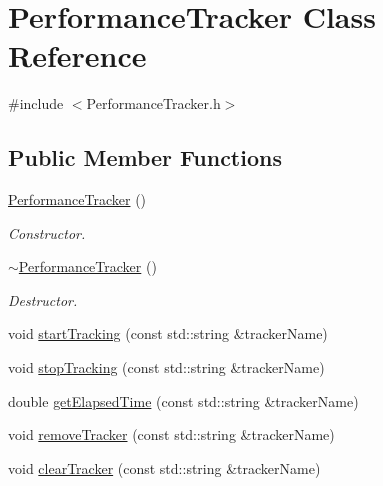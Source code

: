 \hypertarget{class_performance_tracker}{\section{Performance\-Tracker Class Reference}
\label{class_performance_tracker}
}


{\ttfamily \#include $<$Performance\-Tracker.\-h$>$}

\subsection*{Public Member Functions}
\begin{DoxyCompactItemize}
\item 
\hypertarget{class_performance_tracker_a3ca7c573d743478e4924f3239f258a70}{\hyperlink{class_performance_tracker_a3ca7c573d743478e4924f3239f258a70}{Performance\-Tracker} ()}\label{class_performance_tracker_a3ca7c573d743478e4924f3239f258a70}

\begin{DoxyCompactList}\small\item\em Constructor. \end{DoxyCompactList}\item 
\hypertarget{class_performance_tracker_a58ca08b74e28ccea87a8ecd6d2d5e7c0}{\hyperlink{class_performance_tracker_a58ca08b74e28ccea87a8ecd6d2d5e7c0}{$\sim$\-Performance\-Tracker} ()}\label{class_performance_tracker_a58ca08b74e28ccea87a8ecd6d2d5e7c0}

\begin{DoxyCompactList}\small\item\em Destructor. \end{DoxyCompactList}\item 
void \hyperlink{class_performance_tracker_abffee8acc3818592a7011dec4c6100c8}{start\-Tracking} (const std\-::string \&tracker\-Name)
\item 
void \hyperlink{class_performance_tracker_ac1dfa09a27f6dd1baeeb8068b009a432}{stop\-Tracking} (const std\-::string \&tracker\-Name)
\item 
double \hyperlink{class_performance_tracker_a6197691d9a0e4bce1d69e78a589a31fb}{get\-Elapsed\-Time} (const std\-::string \&tracker\-Name)
\item 
void \hyperlink{class_performance_tracker_a0caacd20bc7e668cdfb9ef9567df6aeb}{remove\-Tracker} (const std\-::string \&tracker\-Name)
\item 
void \hyperlink{class_performance_tracker_a81acadf369ceab082eea07241eb14866}{clear\-Tracker} (const std\-::string \&tracker\-Name)
\end{DoxyCompactItemize}


